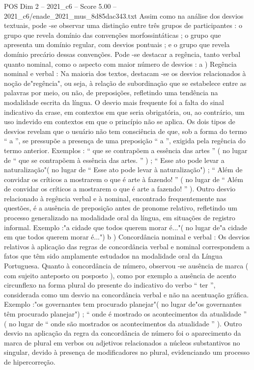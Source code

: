 \begin{textsample}{POS Dim 2 – 2021\_c6 – Score 5.00 – 2021\_c6/enade\_2021\_mus\_8d85dac343.txt}
Assim como na análise dos desvios textuais, pode -se observar uma distinção entre três grupos de participantes : o grupo que revela domínio das convenções morfossintáticas ; o grupo que apresenta um domínio regular, com desvios pontuais ; e o grupo que revela domínio precário dessas convenções.
Pode -se destacar a regência, tanto verbal quanto nominal, como o aspecto com maior número de desvios : a ) Regência nominal e verbal : Na maioria dos textos, destacam -se os desvios relacionados à noção de"regência", ou seja, à relação de subordinação que se estabelece entre as palavras por meio, ou não, de preposições, refletindo uma tendência na modalidade escrita da língua.
O desvio mais frequente foi a falta do sinal indicativo da crase, em contextos em que seria obrigatória, ou, ao contrário, um uso indevido em contextos em que o princípio não se aplica.
Os dois tipos de desvios revelam que o usuário não tem consciência de que, sob a forma do termo “ a ”, se pressupõe a presença de uma preposição “ a ”, exigida pela regência do termo anterior.
Exemplos : “ que se contrapõem a essência das artes ” ( no lugar de “ que se contrapõem à essência das artes. ” ) ; “ Esse ato pode levar a naturalização"( no lugar de “ Esse ato pode levar à naturalização") ; “ Além de convidar os críticos a mostrarem o que é arte à fazendo! ” ( no lugar de “ Além de convidar os críticos a mostrarem o que é arte a fazendo! ” ).
Outro desvio relacionado à regência verbal e à nominal, encontrado frequentemente nas questões, é a ausência de preposição antes de pronome relativo, refletindo um processo generalizado na modalidade oral da língua, em situações de registro informal.
Exemplo :"a cidade que todos querem morar é..."( no lugar de"a cidade em que todos querem morar é...") b ) Concordância nominal e verbal : Os desvios relativos à aplicação das regras de concordância verbal e nominal correspondem a fatos que têm sido amplamente estudados na modalidade oral da Língua Portuguesa.
Quanto à concordância de número, observou -se ausência de marca ( com sujeito anteposto ou posposto ), como por exemplo a ausência de acento circunflexo na forma plural do presente do indicativo do verbo “ ter ”, considerada como um desvio na concordância verbal e não na acentuação gráfica.
Exemplo :"os governantes tem procurado planejar"( no lugar de"os governantes têm procurado planejar") ; “ onde é mostrado os acontecimentos da atualidade ” ( no lugar de “ onde são mostrados os acontecimentos da atualidade ” ).
Outro desvio na aplicação da regra da concordância de número foi o aparecimento da marca de plural em verbos ou adjetivos relacionados a núcleos substantivos no singular, devido à presença de modificadores no plural, evidenciando um processo de hipercorreção.

\end{textsample}
